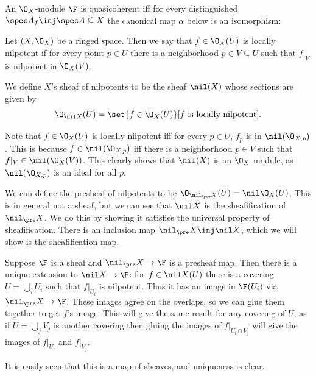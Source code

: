 \blemm

    An $\O_X$-module $\F$ is quasicoherent iff for every distinguished $\spec A_f\inj\spec A\subseteq X$ the canonical map $\alpha$ below is an isomorphism:


\elemm

\bdefn

    Let $(X,\O_X)$ be a ringed space.
    Then we say that $f\in\O_X(U)$ is {\emphcolor locally nilpotent} if for every point $p\in U$ there is a neighborhood $p\in V\subseteq U$ such that $f|_V$ is nilpotent
    in $\O_X(V)$.

    We define $X$'s {\emphcolor sheaf of nilpotents} to be the sheaf $\nil(X)$ whose sections are given by
    $$ \O_{\nil X}(U) = \set{f\in\O_X(U)}[\hbox{$f$ is locally nilpotent}] . $$

\edefn

Note that $f\in\O_X(U)$ is locally nilpotent iff for every $p\in U$, $f_p$ is in $\nil(\O_{X,p})$.
This is because $f\in\nil(\O_{X,p})$ iff there is a neighborhood $p\in V$ such that $f|_V\in\nil(\O_X(V))$.
This clearly shows that $\nil(X)$ is an $\O_X$-module, as $\nil(\O_{X,p})$ is an ideal for all $p$.

We can define the {\emphcolor presheaf of nilpotents} to be $\O_{\nil_\pre X}(U)=\nil\O_X(U)$.
This is in general not a sheaf, but we can see that $\nil X$ is the sheafification of $\nil_\pre X$.
We do this by showing it satisfies the universal property of sheafification.
There is an inclusion map $\nil_\pre X\inj\nil X$, which we will show is the sheafification map.

Suppose $\F$ is a sheaf and $\nil_\pre X\to\F$ is a presheaf map.
Then there is a unique extension to $\nil X\to\F$: for $f\in\nil X(U)$ there is a covering $U=\bigcup_iU_i$ such that $f|_{U_i}$ is nilpotent.
Thus it has an image in $\F(U_i)$ via $\nil_\pre X\to\F$.
These images agree on the overlaps, so we can glue them together to get $f$'s image.
This will give the same result for any covering of $U$, as if $U=\bigcup_jV_j$ is another covering then gluing the images of $f|_{U_i\cap V_j}$ will give the images of $f|_{U_i}$ and
$f|_{V_j}$.

It is easily seen that this is a map of sheaves, and uniqueness is clear.

